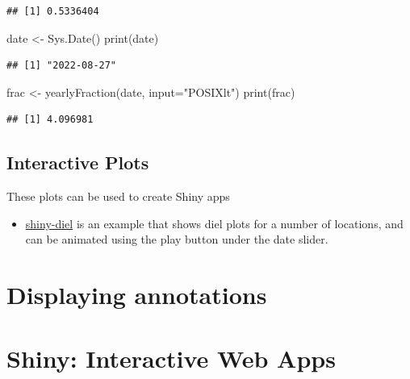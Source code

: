 \documentclass[
]{book}
\newenvironment{Shaded}{\begin{snugshade}}{\end{snugshade}}
\newcommand{\AttributeTok}[1]{\textcolor[rgb]{0.77,0.63,0.00}{#1}}
\newcommand{\FunctionTok}[1]{\textcolor[rgb]{0.00,0.00,0.00}{#1}}
\newcommand{\NormalTok}[1]{#1}
\newcommand{\OtherTok}[1]{\textcolor[rgb]{0.56,0.35,0.01}{#1}}
\newcommand{\StringTok}[1]{\textcolor[rgb]{0.31,0.60,0.02}{#1}}
\providecommand{\tightlist}{%
  \setlength{\itemsep}{0pt}\setlength{\parskip}{0pt}}
\begin{document}
\begin{verbatim}
## [1] 0.5336404
\end{verbatim}

\begin{Shaded}
\begin{Highlighting}[]
\NormalTok{date }\OtherTok{\textless{}{-}} \FunctionTok{Sys.Date}\NormalTok{()}
\FunctionTok{print}\NormalTok{(date)}
\end{Highlighting}
\end{Shaded}

\begin{verbatim}
## [1] "2022-08-27"
\end{verbatim}

\begin{Shaded}
\begin{Highlighting}[]
\NormalTok{frac }\OtherTok{\textless{}{-}} \FunctionTok{yearlyFraction}\NormalTok{(date, }\AttributeTok{input=}\StringTok{"POSIXlt"}\NormalTok{)}
\FunctionTok{print}\NormalTok{(frac)}
\end{Highlighting}
\end{Shaded}

\begin{verbatim}
## [1] 4.096981
\end{verbatim}

\hypertarget{interactive-plots}{%
\section{Interactive Plots}\label{interactive-plots}}

These plots can be used to create Shiny apps

\begin{itemize}
\tightlist
\item
  \href{https://shiny.ebaker.me.uk/shiny-diel/}{shiny-diel} is an example that shows diel plots for a number of locations, and can be animated using the play button under the date slider.
\end{itemize}

\hypertarget{displaying-annotations}{%
\chapter{Displaying annotations}\label{displaying-annotations}}

\hypertarget{shiny-interactive-web-apps}{%
\chapter{Shiny: Interactive Web Apps}\label{shiny-interactive-web-apps}}
\end{document}
